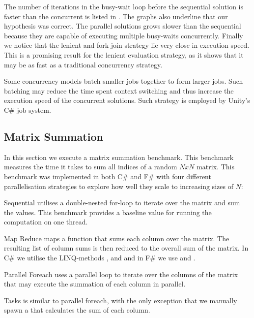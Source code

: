 
The number of iterations in the busy-wait loop before the sequential solution is faster than the concurrent is listed in . The graphs also underline that our hypothesis was correct. The parallel solutions grows slower than the sequential because they are capable of executing multiple busy-waits concurrently. Finally we notice that the lenient and fork join strategy lie very close in execution speed. This is a promising result for the lenient evaluation strategy, as it shows that it may be as fast as a traditional concurrency strategy.

Some concurrency models batch smaller jobs together to form larger jobs. Such batching may reduce the time spent context switching and thus increase the execution speed of the concurrent solutions. Such strategy is employed by Unity's C\# job system\cite{unity:csharp:job:system}.

\subsection{Matrix Summation}
In this section we execute a matrix summation benchmark. This benchmark measures the time it takes to sum all indices of a random $N x N$ matrix. This benchmark was implemented in both C\# and F\# with four different parallelisation strategies to explore how well they scale to increasing sizes of $N$:

\begin{labeling}{\quad\quad}
    \item[Sequential] utilises a double-nested for-loop to iterate over the matrix and sum the values. This benchmark provides a baseline value for running the computation on one thread.
    \item[Map Reduce] maps a function that sums each column over the matrix. The resulting list of column sums is then reduced to the overall sum of the matrix. In C\# we utilise the \gls{LINQ}-methods ,  and  and in F\# we use  and .
    \item[Parallel Foreach] uses a parallel loop to iterate over the columns of the matrix that may execute the summation of each column in parallel.
    \item[Tasks] is similar to parallel foreach, with the only exception that we manually spawn a  that calculates the sum of each column.
\end{labeling}

